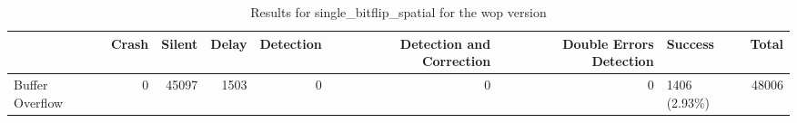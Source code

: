 \begin{table}[t]
	\centering
	\caption{Results for single_bitflip_spatial for the wop version}
	\label{table:end_sim_by_status_wop_1_single_bitflip_spatial}
	\begin{tabular}{lrrrrrrlr}
		\toprule
		                & Crash & Silent & Delay & Detection & Detection and Correction & Double Errors Detection & Success       & Total \\
		\midrule
		Buffer Overflow & 0     & 45097  & 1503  & 0         & 0                        & 0                       & 1406 (2.93\%) & 48006 \\
		\bottomrule
	\end{tabular}
\end{table}
